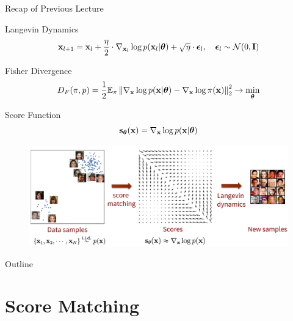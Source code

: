 \documentclass{beamer}
\begin{document}
\begin{frame}{Recap of Previous Lecture}
		\vspace{-0.3cm}
	\begin{block}{Langevin Dynamics}
		\vspace{-0.3cm}
		\[
			\mathbf{x}_{l + 1} = \mathbf{x}_l + \frac{\eta}{2} \cdot \nabla_{\mathbf{x}_l} \log p(\mathbf{x}_l | \boldsymbol{\theta}) + \sqrt{\eta} \cdot \boldsymbol{\epsilon}_l, \quad \boldsymbol{\epsilon}_l \sim \mathcal{N}(0, \mathbf{I})
		\]
		\vspace{-0.7cm}
	\end{block}
	\begin{block}{Fisher Divergence}
		\vspace{-0.3cm}
		\[
			D_F(\pi, p) = \frac{1}{2}\mathbb{E}_{\pi}\left\| \nabla_{\mathbf{x}}\log p(\mathbf{x}| \boldsymbol{\theta}) - \nabla_{\mathbf{x}} \log \pi(\mathbf{x}) \right\|_2^2 \rightarrow \min_{\boldsymbol{\theta}}
		\]
		\vspace{-0.7cm}
	\end{block}
	\begin{block}{Score Function}
		\vspace{-0.5cm}
		 \[
			 \mathbf{s}_{\boldsymbol{\theta}}(\mathbf{x}) = \nabla_{\mathbf{x}}\log p(\mathbf{x}| \boldsymbol{\theta})
		 \]
	 \vspace{-0.8cm}
	\end{block}
	\begin{figure}
		\centering
		\includegraphics[width=0.75\linewidth]{figs/smld}
	\end{figure}
\end{frame}
\begin{frame}{Outline}
	\tableofcontents
\end{frame}
\section{Score Matching}
\end{document}

